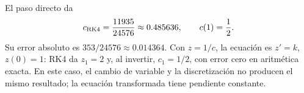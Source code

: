 El paso directo da
\[
c_{\rm RK4}=\frac{11935}{24576}\approx0.485636,
\qquad c(1)=\frac12.
\]
Su error absoluto es \(353/24576\approx0.014364\). Con \(z=1/c\), la ecuación es \(z'=k\), \(z(0)=1\): RK4 da \(z_1=2\) y, al invertir, \(c_1=1/2\), con error cero en aritmética exacta. En este caso, el cambio de variable y la discretización no producen el mismo resultado; la ecuación transformada tiene pendiente constante.

